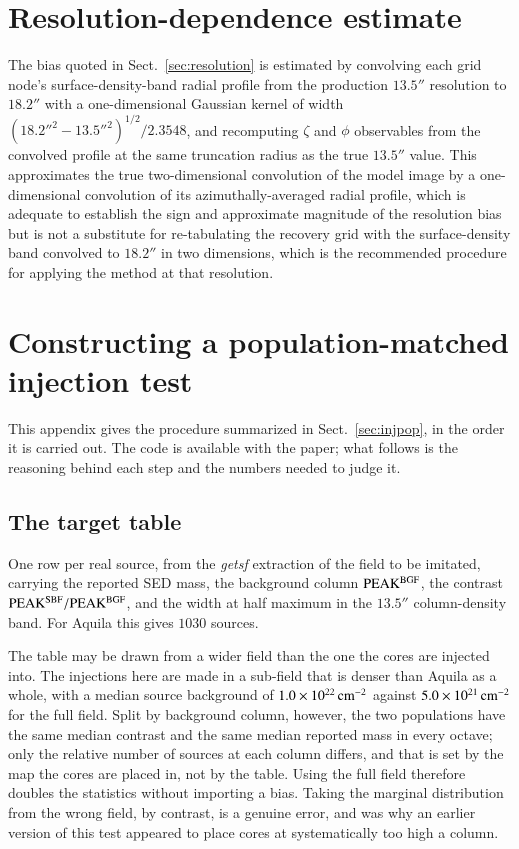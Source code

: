 \documentclass{aa}
\begin{document}
\section{Resolution-dependence estimate}
\label{app:resolution}

The bias quoted in Sect.~\ref{sec:resolution} is estimated by convolving
each grid node's surface-density-band radial profile from the production
$13.5''$ resolution to $18.2''$ with a one-dimensional Gaussian kernel of
width $(18.2''^2-13.5''^2)^{1/2}/2.3548$, and recomputing $\zeta$
and $\phi$ observables from the convolved profile at the same
truncation radius as the true $13.5''$ value. This approximates the true
two-dimensional convolution of the model image by a one-dimensional
convolution of its azimuthally-averaged radial profile, which is adequate
to establish the sign and approximate magnitude of the resolution bias but
is not a substitute for re-tabulating the recovery grid with the
surface-density band convolved to $18.2''$ in two dimensions, which is the
recommended procedure for applying the method at that resolution.

\section{Constructing a population-matched injection test}
\label{app:injection}

This appendix gives the procedure summarized in Sect.~\ref{sec:injpop}, in the
order it is carried out. The code is available with the paper; what follows is
the reasoning behind each step and the numbers needed to judge it.

\subsection{The target table}
One row per real source, from the \emph{getsf}
extraction of the field to be imitated, carrying the reported SED mass, the
background column ${\rm PEAK^{BGF}}$, the contrast
${\rm PEAK^{SBF}}/{\rm PEAK^{BGF}}$, and the width at half maximum in
the $13.5''$ column-density band. For Aquila this gives $1030$ sources.

The table may be drawn from a wider field than the one the cores are injected
into. The injections here are made in a sub-field that is denser than Aquila
as a whole, with a median source background of
$1.0\times10^{22}\,{\rm cm^{-2}}$ against $5.0\times10^{21}\,
{\rm cm^{-2}}$ for the full field. Split by background column, however, the
two populations have the same median contrast and the same median reported
mass in every octave; only the relative number of sources at each column
differs, and that is set by the map the cores are placed in, not by the table.
Using the full field therefore doubles the statistics without importing a
bias. Taking the marginal distribution from the wrong field, by contrast, is a
genuine error, and was why an earlier version of this test appeared to place
cores at systematically too high a column.
\end{document}
